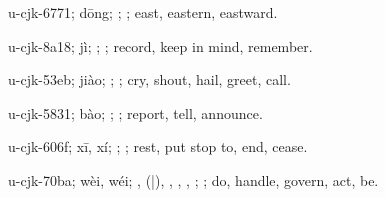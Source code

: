 \begin{multicols}{2}
{\cjkgGlue{}u-cjk-6771; dōng; \cjkgGlue{}; \cjkgGlue{}; east, eastern, eastward.

\cjkgGlue{}u-cjk-8a18; jì; \cjkgGlue{}\cjkgGlue{}\cjkgGlue{}; \cjkgGlue{}; record, keep in mind, remember.

\cjkgGlue{}u-cjk-53eb; jiào; \cjkgGlue{}\cjkgGlue{}\cjkgGlue{}; \cjkgGlue{}; cry, shout, hail, greet, call.

\cjkgGlue{}u-cjk-5831; bào; \cjkgGlue{}\cjkgGlue{}\cjkgGlue{}; \cjkgGlue{}; report, tell, announce.

\cjkgGlue{}u-cjk-606f; xī, xí; \cjkgGlue{}; \cjkgGlue{}; rest, put stop to, end, cease.

\cjkgGlue{}u-cjk-70ba; wèi, wéi; \cjkgGlue{}, \cjkgGlue{}\cjkgGlue{}(\cjkgGlue{}|\cjkgGlue{}), \cjkgGlue{}\cjkgGlue{}\cjkgGlue{}, \cjkgGlue{}, \cjkgGlue{}\cjkgGlue{}\cjkgGlue{}, \cjkgGlue{}; \cjkgGlue{}; do, handle, govern, act, be.

}
\end{multicols}
